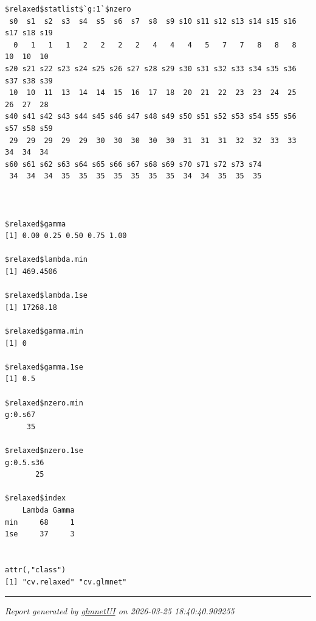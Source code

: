 \documentclass[
]{article}
\begin{document}
\begin{verbatim}
$relaxed$statlist$`g:1`$nzero
 s0  s1  s2  s3  s4  s5  s6  s7  s8  s9 s10 s11 s12 s13 s14 s15 s16 s17 s18 s19 
  0   1   1   1   2   2   2   2   4   4   4   5   7   7   8   8   8  10  10  10 
s20 s21 s22 s23 s24 s25 s26 s27 s28 s29 s30 s31 s32 s33 s34 s35 s36 s37 s38 s39 
 10  10  11  13  14  14  15  16  17  18  20  21  22  23  23  24  25  26  27  28 
s40 s41 s42 s43 s44 s45 s46 s47 s48 s49 s50 s51 s52 s53 s54 s55 s56 s57 s58 s59 
 29  29  29  29  29  30  30  30  30  30  31  31  31  32  32  33  33  34  34  34 
s60 s61 s62 s63 s64 s65 s66 s67 s68 s69 s70 s71 s72 s73 s74 
 34  34  34  35  35  35  35  35  35  35  34  34  35  35  35 



$relaxed$gamma
[1] 0.00 0.25 0.50 0.75 1.00

$relaxed$lambda.min
[1] 469.4506

$relaxed$lambda.1se
[1] 17268.18

$relaxed$gamma.min
[1] 0

$relaxed$gamma.1se
[1] 0.5

$relaxed$nzero.min
g:0.s67 
     35 

$relaxed$nzero.1se
g:0.5.s36 
       25 

$relaxed$index
    Lambda Gamma
min     68     1
1se     37     3


attr(,"class")
[1] "cv.relaxed" "cv.glmnet" 
\end{verbatim}

\begin{center}\rule{0.5\linewidth}{0.5pt}\end{center}

\emph{Report generated by
\href{https://github.com/wcraytor/glmnetUI}{glmnetUI} on 2026-03-25
18:40:40.909255}
\end{document}
